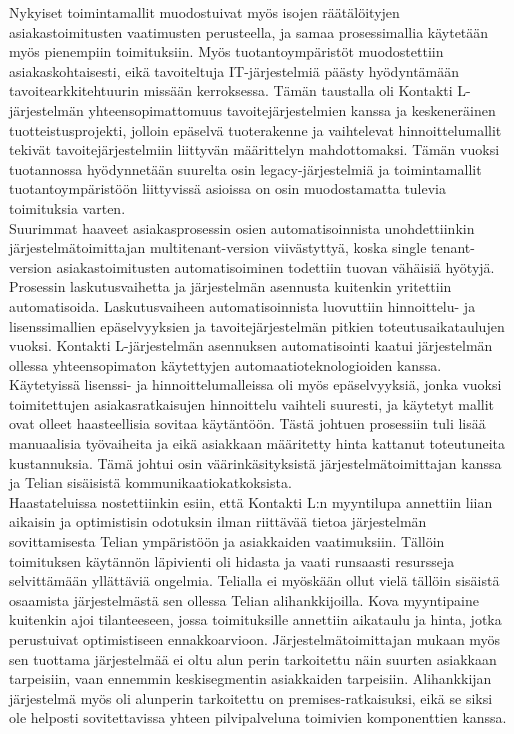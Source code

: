 \documentclass[finnish,12pt,a4paper,pdftex]{article}
\begin{document}
Nykyiset toimintamallit muodostuivat myös isojen räätälöityjen asiakastoimitusten vaatimusten perusteella, ja samaa prosessimallia käytetään myös pienempiin toimituksiin. Myös tuotantoympäristöt muodostettiin asiakaskohtaisesti, eikä tavoiteltuja IT-järjestelmiä päästy hyödyntämään tavoitearkkitehtuurin missään kerroksessa. Tämän taustalla oli Kontakti L-järjestelmän yhteensopimattomuus tavoitejärjestelmien kanssa ja keskeneräinen tuotteistusprojekti, jolloin epäselvä tuoterakenne ja vaihtelevat hinnoittelumallit tekivät tavoitejärjestelmiin liittyvän määrittelyn mahdottomaksi. Tämän vuoksi tuotannossa hyödynnetään suurelta osin legacy-järjestelmiä ja toimintamallit tuotantoympäristöön liittyvissä asioissa on osin muodostamatta tulevia toimituksia varten.\\

Suurimmat haaveet asiakasprosessin osien automatisoinnista unohdettiinkin järjestelmätoimittajan multitenant-version viivästyttyä, koska single tenant-version asiakastoimitusten automatisoiminen todettiin tuovan vähäisiä hyötyjä. Prosessin laskutusvaihetta ja järjestelmän asennusta kuitenkin yritettiin automatisoida. Laskutusvaiheen automatisoinnista luovuttiin hinnoittelu- ja lisenssimallien epäselvyyksien ja tavoitejärjestelmän pitkien toteutusaikataulujen vuoksi. Kontakti L-järjestelmän asennuksen automatisointi kaatui järjestelmän ollessa yhteensopimaton käytettyjen automaatioteknologioiden kanssa.\\ 

Käytetyissä lisenssi- ja hinnoittelumalleissa oli myös epäselvyyksiä, jonka vuoksi toimitettujen asiakasratkaisujen hinnoittelu vaihteli suuresti, ja käytetyt mallit ovat olleet haasteellisia sovitaa käytäntöön. Tästä johtuen prosessiin tuli lisää manuaalisia työvaiheita ja eikä asiakkaan määritetty hinta kattanut toteutuneita kustannuksia. Tämä johtui osin väärinkäsityksistä järjestelmätoimittajan kanssa ja Telian sisäisistä kommunikaatiokatkoksista.\\

Haastateluissa nostettiinkin esiin, että Kontakti L:n myyntilupa annettiin liian aikaisin ja optimistisin odotuksin ilman riittävää tietoa järjestelmän sovittamisesta Telian ympäristöön ja asiakkaiden vaatimuksiin. Tällöin toimituksen käytännön läpivienti oli hidasta ja vaati runsaasti resursseja selvittämään yllättäviä ongelmia. Telialla ei myöskään ollut vielä tällöin sisäistä osaamista järjestelmästä sen ollessa Telian alihankkijoilla. Kova myyntipaine kuitenkin ajoi tilanteeseen, jossa toimituksille annettiin aikataulu ja hinta, jotka perustuivat optimistiseen ennakkoarvioon. Järjestelmätoimittajan mukaan myös sen tuottama järjestelmää ei oltu alun perin tarkoitettu näin suurten asiakkaan tarpeisiin, vaan ennemmin keskisegmentin asiakkaiden tarpeisiin. Alihankkijan järjestelmä myös oli alunperin tarkoitettu on premises-ratkaisuksi, eikä se siksi ole helposti sovitettavissa yhteen pilvipalveluna toimivien komponenttien kanssa.\\
\end{document}
